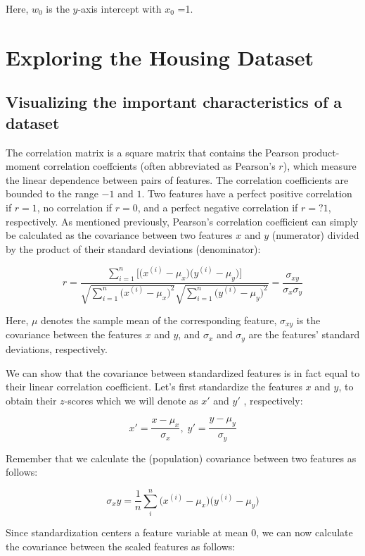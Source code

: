 \documentclass[letterpaper]{report}
\begin{document}
Here, $w_0$ is the $y$-axis intercept with $x_0$ =1.

\section{Exploring the Housing Dataset}
\subsection{Visualizing the important characteristics of a dataset}

The correlation matrix is a square matrix that contains the Pearson product-moment correlation coeffcients (often abbreviated as Pearson's $r$), which measure the linear dependence between pairs of features. The correlation coefficients are bounded to the range $-1$ and $1$. Two features have a perfect positive correlation if $r =1$, no correlation if $r = 0$, and a perfect negative correlation if $r = ?1$, respectively. As mentioned previously, Pearson's correlation coefficient can simply be calculated as the covariance between two features $x$ and $y$ (numerator) divided by the product of their standard deviations (denominator):

\[
r = \frac{\sum_{i=1}^{n} \Big[ \big( x^{(i)} - \mu_x \big) \big( y^{(i)} - \mu_y  \big) \Big]  }{ \sqrt{\sum_{i=1}^{n} \big( x^{(i)} - \mu_x  \big)^2}  \sqrt{\sum_{i=1}^{n} \big( y^{(i)} - \mu_y  \big)^2}} = \frac{\sigma_{xy}}{\sigma_x \sigma_y}
\]

Here, $\mu$ denotes the sample mean of the corresponding feature, $\sigma_{xy}$ is the covariance between the features $x$ and $y$, and $\sigma_x$ and $\sigma_y$ are the features'
standard deviations, respectively.

We can show that the covariance between standardized features is in fact equal to their linear correlation coefficient. Let's first standardize the features $x$ and $y$, to obtain their $z$-scores which we will denote as $x'$ and $y'$ , respectively:

\[
x' = \frac{x-\mu_x}{\sigma_x}, \; y' = \frac{y - \mu_y}{\sigma_y}
\]

Remember that we calculate the (population) covariance between two features as follows:

\[
\sigma_xy = \frac{1}{n} \sum_{i}^{n} \big( x^{(i)} - \mu_x \big) \big(  y^{(i)} - \mu_y \big)
\]

Since standardization centers a feature variable at mean 0, we can now calculate the covariance between the scaled features as follows:
\end{document}
